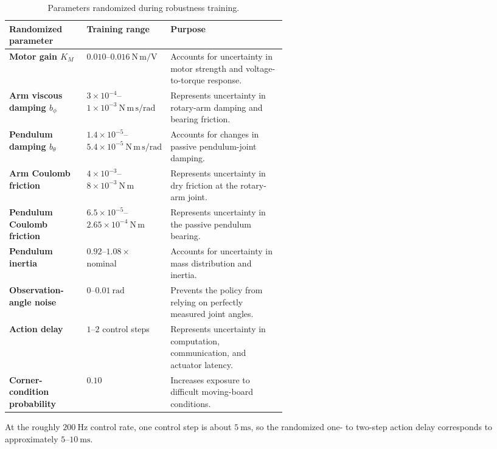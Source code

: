 \documentclass[9pt]{extarticle}
\begin{document}
\begin{table}[h]
\centering
\footnotesize
\renewcommand{\arraystretch}{0.95}
\caption{Parameters randomized during robustness training.}
\begin{tabularx}{0.96\linewidth}
{>{\bfseries}p{0.28\linewidth}
 p{0.25\linewidth}
 X}
\toprule
Randomized parameter & Training range & Purpose \\
\midrule

Motor gain $K_M$
&
$0.010$--$0.016~\mathrm{N\,m/V}$
&
Accounts for uncertainty in motor strength and voltage-to-torque response.
\\

Arm viscous damping $b_\phi$
&
$3\times10^{-4}$--$1\times10^{-3}~
\mathrm{N\,m\,s/rad}$
&
Represents uncertainty in rotary-arm damping and bearing friction.
\\

Pendulum damping $b_\theta$
&
$1.4\times10^{-5}$--$5.4\times10^{-5}~
\mathrm{N\,m\,s/rad}$
&
Accounts for changes in passive pendulum-joint damping.
\\

Arm Coulomb friction
&
$4\times10^{-3}$--$8\times10^{-3}~\mathrm{N\,m}$
&
Represents uncertainty in dry friction at the rotary-arm joint.
\\

Pendulum Coulomb friction
&
$6.5\times10^{-5}$--$2.65\times10^{-4}~\mathrm{N\,m}$
&
Represents uncertainty in the passive pendulum bearing.
\\

Pendulum inertia
&
$0.92$--$1.08\times$ nominal
&
Accounts for uncertainty in mass distribution and inertia.
\\

Observation-angle noise
&
$0$--$0.01~\mathrm{rad}$
&
Prevents the policy from relying on perfectly measured joint angles.
\\

Action delay
&
$1$--$2$ control steps
&
Represents uncertainty in computation, communication, and actuator latency.
\\

Corner-condition probability
&
$0.10$
&
Increases exposure to difficult moving-board conditions.
\\

\bottomrule
\end{tabularx}
\end{table}

At the roughly $200~\mathrm{Hz}$ control rate, one control step is about
$5~\mathrm{ms}$, so the randomized one- to two-step action delay
corresponds to approximately $5$--$10~\mathrm{ms}$.
\end{document}
